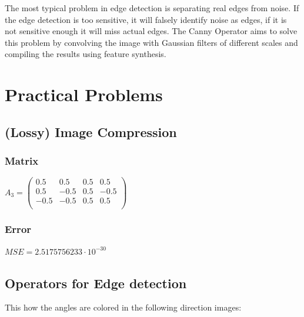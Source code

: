 \documentclass[a4paper,12pt]{article}
\begin{document}
	\subsubsection{}
	The most typical problem in edge detection is separating real edges from noise. If the edge detection is too sensitive, it will falsely identify noise as edges, if it is not sensitive enough it will miss actual edges. The Canny Operator aims to solve this problem by convolving the image with Gaussian filters of different scales and compiling the results using feature synthesis. 
	
	\section{Practical Problems}
	\subsection{(Lossy) Image Compression}
	\subsubsection{Matrix}
	$A_3 =
	\begin{pmatrix}
	0.5 & 0.5 & 0.5 & 0.5\\
	0.5 & -0.5 & 0.5 & -0.5\\
	-0.5 & -0.5 & 0.5 & 0.5\\
    \end{pmatrix}		
	$
	\subsubsection{Error}
	$MSE = 2.5175756233 \cdot 10^{-30}$
	
	\subsection{Operators for Edge detection}
	
	This how the angles are colored in the following direction images: \quad
	
\end{document}
